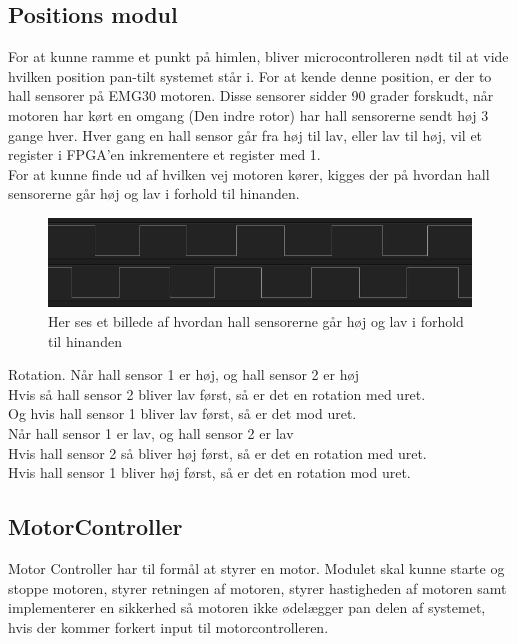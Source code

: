 \subsection{Positions modul}
\label{subsec:TicksToDeg}

For at kunne ramme et punkt på himlen, bliver microcontrolleren nødt til at vide hvilken position pan-tilt systemet står i.
For at kende denne position, er der to hall sensorer på EMG30 motoren.
Disse sensorer sidder 90 grader forskudt, når motoren har kørt en omgang (Den indre rotor) har hall sensorerne sendt høj 3 gange hver.
Hver gang en hall sensor går fra høj til lav, eller lav til høj, vil et register i FPGA'en inkrementere et register med 1.\\

For at kunne finde ud af hvilken vej motoren kører, kigges der på hvordan hall sensorerne går høj og lav i forhold til hinanden.

\begin{figure}[ht]
	\begin{center}
		\includegraphics[scale=0.5]{Billeder/Hall_sensorer.png}
	\end{center}
\label{fig:Hall_Sensorer}
\caption{Her ses et billede af hvordan hall sensorerne går høj og lav i forhold til hinanden}
\end{figure}

Rotation.
Når hall sensor 1 er høj, og hall sensor 2 er høj\\
Hvis så hall sensor 2 bliver lav først, så er det en rotation med uret.\\
Og hvis hall sensor 1 bliver lav først, så er det mod uret.\\

Når hall sensor 1 er lav, og hall sensor 2 er lav\\
Hvis hall sensor 2 så bliver høj først, så er det en rotation med uret.\\
Hvis hall sensor 1 bliver høj først, så er det en rotation mod uret.\\

\subsection{MotorController}
Motor Controller har til formål at styrer en motor. Modulet skal kunne starte og stoppe motoren, styrer retningen af motoren, styrer hastigheden af motoren samt implementerer en sikkerhed så motoren ikke ødelægger pan delen af systemet, hvis der kommer forkert input til motorcontrolleren.

